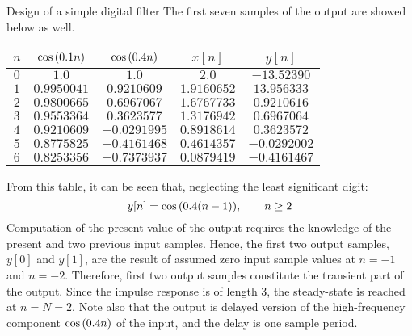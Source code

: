 \documentclass[../../main/main.tex]{subfiles}
\begin{document}
\begin{example}{Design of a simple digital filter}{}
    The first seven samples of the output are showed below as well.

    \begin{center}
        \begin{tabular}{ccccc}
            \toprule
            \( n \) &   \( \cos\qty(0.1n) \)    &   \( \cos\qty(0.4n) \)    &   \( x[n] \)  &   \( y[n] \)  \\
            \midrule
            \( 0 \)   &  \( 1.0       \)  & \(  1.0       \)  &  \( 2.0       \)  & \( -13.52390   \)   \\
            \( 1 \)   &  \( 0.9950041 \)  & \(  0.9210609 \)  &  \( 1.9160652 \)  & \(  13.956333  \)   \\
            \( 2 \)   &  \( 0.9800665 \)  & \(  0.6967067 \)  &  \( 1.6767733 \)  & \(   0.9210616 \)   \\
            \( 3 \)   &  \( 0.9553364 \)  & \(  0.3623577 \)  &  \( 1.3176942 \)  & \(   0.6967064 \)   \\
            \( 4 \)   &  \( 0.9210609 \)  & \( -0.0291995 \)  &  \( 0.8918614 \)  & \(   0.3623572 \)   \\
            \( 5 \)   &  \( 0.8775825 \)  & \( -0.4161468 \)  &  \( 0.4614357 \)  & \( - 0.0292002 \)   \\
            \( 6 \)   &  \( 0.8253356 \)  & \( -0.7373937 \)  &  \( 0.0879419 \)  & \( - 0.4161467 \)   \\
            \bottomrule
        \end{tabular}
    \end{center}

    From this table, it can be seen that, neglecting the least significant digit:
    \begin{equation}
        y[n]
        =
        \cos\qty(0.4(n-1)),
        \qquad
        n \ge 2
        \label{eq:L09_S69_1}
    \end{equation}
    Computation of the present value of the output requires the knowledge of the present and two previous input samples. Hence, the first two output samples, \( y[0] \) and \( y[1] \), are the result of assumed zero input sample values at \( n=-1 \) and \( n=-2 \). Therefore, first two output samples constitute the transient part of the output. Since the impulse response is of length 3, the steady-state is reached at \( n = N = 2 \). Note also that the output is delayed version of the high-frequency component \( \cos\qty(0.4n) \) of the input, and the delay is one sample period.
\end{example}
\end{document}
